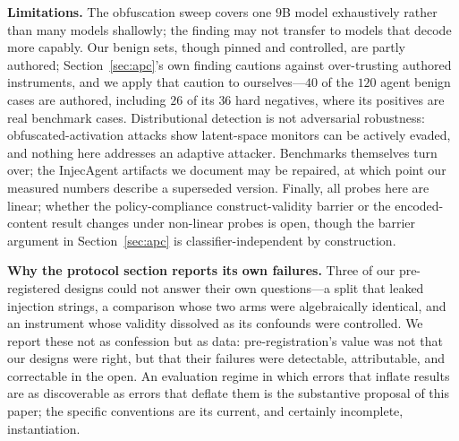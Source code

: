 \textbf{Limitations.} The obfuscation sweep covers one $9$B model exhaustively rather than many models shallowly; the
finding may not transfer to models that decode more capably. Our benign sets, though pinned and controlled, are partly
authored; Section~\ref{sec:apc}'s own finding cautions against over-trusting authored instruments, and we apply that
caution to ourselves---$40$ of the $120$ agent benign cases are authored, including $26$ of its $36$ hard negatives,
where its positives are real benchmark cases.
Distributional detection is not adversarial robustness: obfuscated-activation attacks \cite{bailey2025obfuscated} show
latent-space monitors can be actively evaded, and nothing here addresses an adaptive attacker. Benchmarks themselves
turn over; the InjecAgent artifacts we document \cite{injecagentissue7} may be repaired, at which point our measured
numbers describe a superseded version. Finally, all probes here are linear; whether the policy-compliance
construct-validity barrier or the encoded-content result changes under non-linear probes is open, though the barrier
argument in Section~\ref{sec:apc} is classifier-independent by construction.

\textbf{Why the protocol section reports its own failures.} Three of our pre-registered designs could not answer their
own questions---a split that leaked injection strings, a comparison whose two arms were algebraically identical, and
an instrument whose validity dissolved as its confounds were controlled. We report these not as confession but as
data: pre-registration's value was not that our designs were right, but that their failures were detectable,
attributable, and correctable in the open. An evaluation regime in which errors that inflate results are as
discoverable as errors that deflate them is the substantive proposal of this paper; the specific conventions are its
current, and certainly incomplete, instantiation.
